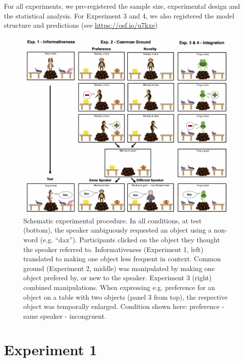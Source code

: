\documentclass[10pt, letterpaper]{article}
\newenvironment{CodeChunk}{}{}
\begin{document}
For all experiments, we pre-registered the sample size, experimental
design and the statistical analysis. For Experiment 3 and 4, we also
registered the model structure and predictions (see
\url{https://osf.io/u7kxe})

\begin{CodeChunk}
\begin{figure}[h]

{\centering \includegraphics{figs/design-1} 

}

\caption[Schematic experimental procedure]{Schematic experimental procedure. In all conditions, at test (bottom), the speaker ambiguously requested an object using a non-word (e.g. “dax”). Participants clicked on the object they thought the speaker referred to. Informativeness (Experiment 1, left) translated to making one object less frequent in context. Common ground (Experiment 2, middle) was manipulated by making one object prefered by, or new to the speaker. Experiment 3 (right) combined manipulations. When expressing e.g. preference for an object on a table with two objects (panel 3 from top), the respective object was temporally enlarged. Condition shown here: preference - same speaker - incongruent.}\label{fig:design}
\end{figure}
\end{CodeChunk}

\section{Experiment 1}\label{experiment-1}
\end{document}
